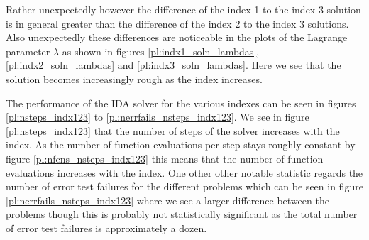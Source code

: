 \documentclass{report}
\newcounter{constant}
\begin{document}
Rather unexpectedly however the difference of the index 1 to the index 3 solution is in general greater than the difference of the index 2 to the index 3 solutions. Also unexpectedly these differences are noticeable in the plots of the Lagrange parameter $\lambda$ as shown in figures \ref{pl:indx1_soln_lambdas}, \ref{pl:indx2_soln_lambdas} and \ref{pl:indx3_soln_lambdas}. Here we see that the solution becomes increasingly rough as the index increases.



The performance of the IDA solver for the various indexes can be seen in figures \ref{pl:nsteps_indx123} to \ref{pl:nerrfails_nsteps_indx123}. We see in figure \ref{pl:nsteps_indx123} that the number of steps of the solver increases with the index. As the number of function evaluations per step stays roughly constant by figure \ref{pl:nfcns_nsteps_indx123} this means that the number of function evaluations increases with the index. One other other notable statistic regards the number of error test failures for the different problems which can be seen in figure \ref{pl:nerrfails_nsteps_indx123} where we see a larger difference between the problems though this is probably not statistically significant as the total number of error test failures is approximately a dozen.
\end{document}
